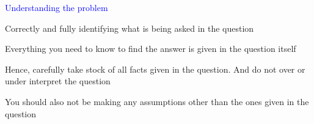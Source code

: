 \documentclass[14pt,fleqn]{extarticle}
\begin{document}
\begin{skill}
\begin{narrow}
\begin{narrow}
\textcolor{blue}{Understanding the problem}

Correctly and fully identifying what
is being asked in the question
\end{narrow}

\reason 

Everything you need to know to find the answer is given in the question itself\newline 

Hence, carefully take stock of all facts given in the question. 
And do not over or under interpret the question \newline 

You should also not be making any assumptions other than the 
ones given in the question
\end{narrow}
\end{skill}
\end{document}
